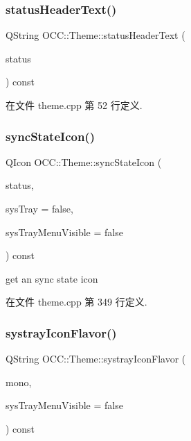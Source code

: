 \subsubsection{\texorpdfstring{status\+Header\+Text()}{statusHeaderText()}}
{\footnotesize\ttfamily Q\+String O\+C\+C\+::\+Theme\+::status\+Header\+Text (\begin{DoxyParamCaption}\item[{\hyperlink{class_o_c_c_1_1_sync_result_a4f4487ea8c462f2ec90c43bce6df1d1e}{Sync\+Result\+::\+Status}}]{status }\end{DoxyParamCaption}) const\hspace{0.3cm}{\ttfamily [virtual]}}



在文件 theme.\+cpp 第 52 行定义.

\mbox{\label{class_o_c_c_1_1_theme_ad4cf5d68c39eba2fe56bb7d5b6da54fc}} 
\subsubsection{\texorpdfstring{sync\+State\+Icon()}{syncStateIcon()}}
{\footnotesize\ttfamily Q\+Icon O\+C\+C\+::\+Theme\+::sync\+State\+Icon (\begin{DoxyParamCaption}\item[{\hyperlink{class_o_c_c_1_1_sync_result_a4f4487ea8c462f2ec90c43bce6df1d1e}{Sync\+Result\+::\+Status}}]{status,  }\item[{bool}]{sys\+Tray = {\ttfamily false},  }\item[{bool}]{sys\+Tray\+Menu\+Visible = {\ttfamily false} }\end{DoxyParamCaption}) const\hspace{0.3cm}{\ttfamily [virtual]}}

get an sync state icon 

在文件 theme.\+cpp 第 349 行定义.

\mbox{\label{class_o_c_c_1_1_theme_afdda3a238298ac997f66d22887b7da68}} 
\subsubsection{\texorpdfstring{systray\+Icon\+Flavor()}{systrayIconFlavor()}}
{\footnotesize\ttfamily Q\+String O\+C\+C\+::\+Theme\+::systray\+Icon\+Flavor (\begin{DoxyParamCaption}\item[{bool}]{mono,  }\item[{bool}]{sys\+Tray\+Menu\+Visible = {\ttfamily false} }\end{DoxyParamCaption}) const}

